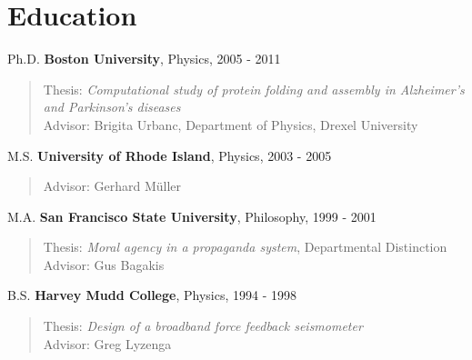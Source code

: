 \documentclass[letterpaper]{article}
\renewenvironment{itemize}{
  \begin{list}{}{
    \setlength{\leftmargin}{1em}
  }
}{
  \end{list}
}
\begin{document}
\section*{Education}
\begin{itemize}
  \item Ph.D. \textbf{Boston University}, Physics, 2005 - 2011	
      \vspace{-0.5em}
 \begin{quote} Thesis: \emph{Computational study of protein folding and assembly in Alzheimer's and Parkinson's diseases}\\
	Advisor: Brigita Urbanc, Department of Physics, Drexel University	
\end{quote}

\item M.S. \textbf{University of Rhode Island}, Physics, 2003 - 2005 
\vspace{-0.5em}
      \begin{quote}Advisor: Gerhard M\"{u}ller
 	\end{quote}
  
\item   M.A. \textbf{San Francisco State University}, Philosophy, 1999 - 2001 
\vspace{-0.5em}
\begin{quote} Thesis: \emph{Moral agency in a propaganda system}, Departmental Distinction\\
	Advisor: Gus Bagakis 
\end{quote}
  
\item   B.S. \textbf{Harvey Mudd College}, Physics, 1994 - 1998 
\vspace{-0.5em} 
     \begin{quote}Thesis: \emph{Design of a broadband force feedback seismometer} \\
      Advisor: Greg Lyzenga
	\end{quote}
\end{itemize}
\end{document}
